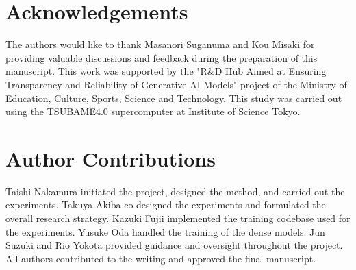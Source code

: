 \ificlrfinal
\section*{Acknowledgements}

The authors would like to thank Masanori Suganuma and Kou Misaki for providing valuable discussions and feedback during the preparation of this manuscript.
This work was supported by the "R\&D Hub Aimed at Ensuring Transparency and Reliability of Generative AI Models" project of the Ministry of Education, Culture, Sports, Science and Technology. This study was carried out using the TSUBAME4.0 supercomputer at Institute of Science Tokyo.

\section*{Author Contributions}
Taishi Nakamura initiated the project, designed the method, and carried out the experiments. Takuya Akiba co-designed the experiments and formulated the overall research strategy. Kazuki Fujii implemented the training codebase used for the experiments. Yusuke Oda handled the training of the dense models. Jun Suzuki and Rio Yokota provided guidance and oversight throughout the project. All authors contributed to the writing and approved the final manuscript.